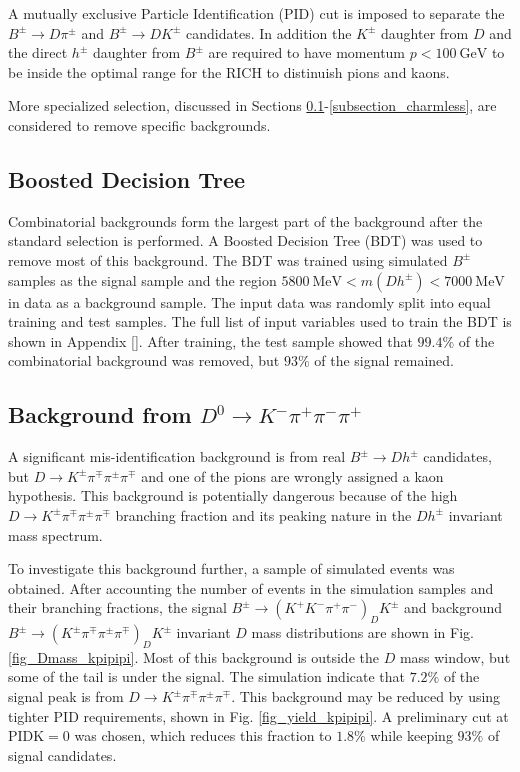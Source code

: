 \documentclass[12pt, a4paper, notitlepage, onecolumn]{article}
\numberwithin{equation}{section}
\begin{document}
A mutually exclusive Particle Identification (PID) cut is imposed to separate the $B^\pm\to D\pi^\pm$ and $B^\pm\to DK^\pm$ candidates. In addition the $K^\pm$ daughter from $D$ and the direct $h^\pm$ daughter from $B^\pm$ are required to have momentum $p < \SI{100}{\giga\eV}$ to be inside the optimal range for the RICH to distinuish pions and kaons.

More specialized selection, discussed in Sections \ref{subsection_BDT}-\ref{subsection_charmless}, are considered to remove specific backgrounds.

\subsection{Boosted Decision Tree}
\label{subsection_BDT}
\noindent Combinatorial backgrounds form the largest part of the background after the standard selection is performed. A Boosted Decision Tree (BDT) was used to remove most of this background. The BDT was trained using simulated $B^\pm$ samples as the signal sample and the region $\SI{5800}{\mega\eV} < m(Dh^\pm) < \SI{7000}{\mega\eV}$ in data as a background sample. The input data was randomly split into equal training and test samples. The full list of input variables used to train the BDT is shown in Appendix \ref{}. After training, the test sample showed that $99.4\%$ of the combinatorial background was removed, but $93\%$ of the signal remained.

\subsection{Background from \texorpdfstring{$D^0\to K^-\pi^+\pi^-\pi^+$}{D->Kpipipi}}
\label{subsection_kpipipi}
\noindent A significant mis-identification background is from real $B^\pm\to Dh^\pm$ candidates, but $D\to K^\pm\pi^\mp\pi^\pm\pi^\mp$ and one of the pions are wrongly assigned a kaon hypothesis. This background is potentially dangerous because of the high $D\to K^\pm\pi^\mp\pi^\pm\pi^\mp$ branching fraction and its peaking nature in the $Dh^\pm$ invariant mass spectrum.

To investigate this background further, a sample of simulated events was obtained. After accounting the number of events in the simulation samples and their branching fractions, the signal $B^\pm\to(K^+K^-\pi^+\pi^-)_DK^\pm$ and background $B^\pm\to(K^\pm\pi^\mp\pi^\pm\pi^\mp)_DK^\pm$ invariant $D$ mass distributions are shown in Fig. \ref{fig_Dmass_kpipipi}. Most of this background is outside the $D$ mass window, but some of the tail is under the signal. The simulation indicate that $7.2\%$ of the signal peak is from $D\to K^\pm\pi^\mp\pi^\pm\pi^\mp$. This background may be reduced by using tighter PID requirements, shown in Fig. \ref{fig_yield_kpipipi}. A preliminary cut at $\text{PIDK} = 0$ was chosen, which reduces this fraction to $1.8\%$ while keeping $93\%$ of signal candidates.
\end{document}
